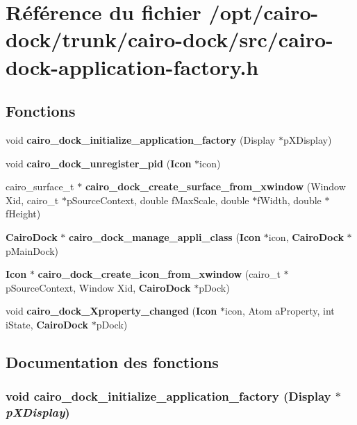 \section{Référence du fichier /opt/cairo-dock/trunk/cairo-dock/src/cairo-dock-application-factory.h}
\label{cairo-dock-application-factory_8h}
\subsection*{Fonctions}
\begin{CompactItemize}
\item 
void {\bf cairo\_\-dock\_\-initialize\_\-application\_\-factory} (Display $\ast$pXDisplay)
\item 
void {\bf cairo\_\-dock\_\-unregister\_\-pid} ({\bf Icon} $\ast$icon)
\item 
cairo\_\-surface\_\-t $\ast$ {\bf cairo\_\-dock\_\-create\_\-surface\_\-from\_\-xwindow} (Window Xid, cairo\_\-t $\ast$pSourceContext, double fMaxScale, double $\ast$fWidth, double $\ast$fHeight)
\item 
{\bf CairoDock} $\ast$ {\bf cairo\_\-dock\_\-manage\_\-appli\_\-class} ({\bf Icon} $\ast$icon, {\bf CairoDock} $\ast$pMainDock)
\item 
{\bf Icon} $\ast$ {\bf cairo\_\-dock\_\-create\_\-icon\_\-from\_\-xwindow} (cairo\_\-t $\ast$pSourceContext, Window Xid, {\bf CairoDock} $\ast$pDock)
\item 
void {\bf cairo\_\-dock\_\-Xproperty\_\-changed} ({\bf Icon} $\ast$icon, Atom aProperty, int iState, {\bf CairoDock} $\ast$pDock)
\end{CompactItemize}


\subsection{Documentation des fonctions}
\subsubsection{\setlength{\rightskip}{0pt plus 5cm}void cairo\_\-dock\_\-initialize\_\-application\_\-factory (Display $\ast$ {\em pXDisplay})}\label{cairo-dock-application-factory_8h_678ef395cc28e3a8fa07ba22577f6bf7}



